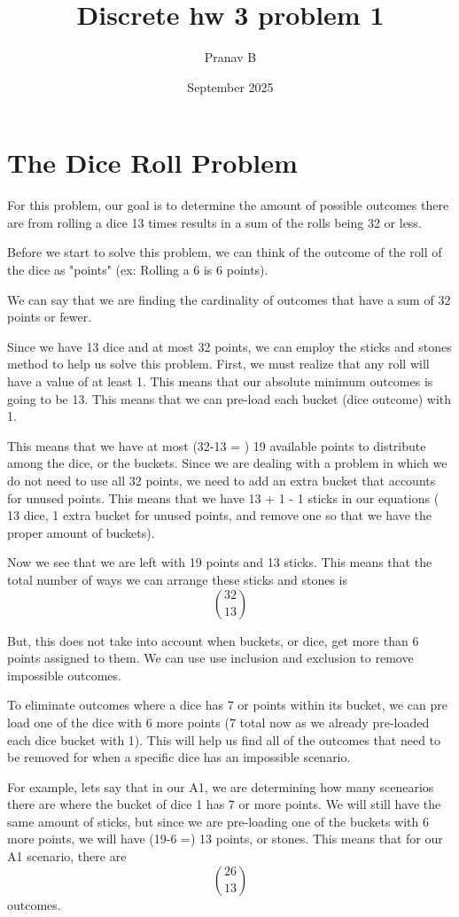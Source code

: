 \documentclass{article}
\title{Discrete hw 3 problem 1}
\author{Pranav B}
\date{September 2025}
\begin{document}
\maketitle

\section{The Dice Roll Problem}

For this problem, our goal is to determine the amount of possible outcomes there are from rolling a dice 13 times results in a sum of the rolls being 32 or less. 

Before we start to solve this problem, we can think of the outcome of the roll of the dice as "points" (ex: Rolling a 6 is 6 points).

We can say that we are finding the cardinality of outcomes that have a sum of 32 points or fewer.

Since we have 13 dice and at most 32 points, we can employ the sticks and stones method to help us solve this problem. First, we must realize that any roll will have a value of at least 1. This means that our absolute minimum outcomes is going to be 13. This means that we can pre-load each bucket (dice outcome) with 1. 

This means that we have at most (32-13 = ) 19 available points to distribute among the dice, or the buckets. Since we are dealing with a problem in which we do not need to use all 32 points, we need to add an extra bucket that accounts for unused points. This means that we have 13 + 1 - 1 sticks in our equations ( 13 dice, 1 extra bucket for unused points, and remove one so that we have the proper amount of buckets).

Now we see that we are left with 19 points and 13 sticks. This means that the total number of ways we can arrange these sticks and stones is  
$$\binom{32}{13}$$

But, this does not take into account when buckets, or dice, get more than 6 points assigned to them. We can use use inclusion and exclusion to remove impossible outcomes. 

To eliminate outcomes where a dice has 7 or points within its bucket, we can pre load one of the dice with 6 more points (7 total now as we already pre-loaded each dice bucket with 1). This will help us find all of the outcomes that need to be removed for when a specific dice has an impossible scenario. 

For example, lets say that in our A1, we are determining how many scenearios there are where the bucket of dice 1 has 7 or more points. We will still have the same amount of sticks, but since we are pre-loading one of the buckets with 6 more points, we will have (19-6 =) 13 points, or stones. This means that for our A1 scenario, there are  
$$\binom{26}{13}$$  
outcomes. 
\end{document}
